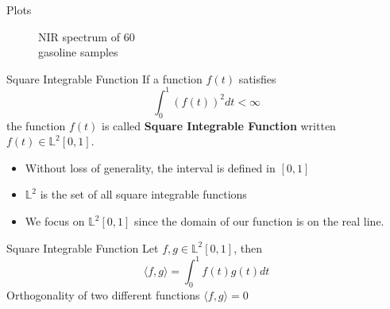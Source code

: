 \documentclass{beamer}
\begin{document}
\begin{frame}{Plots}
\begin{minipage}{.5\textwidth}
\begin{figure}
				\caption{NIR spectrum of 60 \\ gasoline samples}
			\end{figure}
		\end{minipage}
	\end{frame}
	
	\begin{frame}{Square Integrable Function}
		If a function $f(t)$ satisfies
		$$\int_{0}^{1} \left(f(t)\right)^{2}dt < \infty$$
		the function $f(t)$ is called \textbf{Square Integrable Function} written $f(t) \in \mathbb{L}^{2}[0,1]$.
		\begin{itemize}
			\item Without loss of generality, the interval is defined in $[0,1] $
			\item $\mathbb{L}^{2}$ is the set of all square integrable functions
			\item We focus on $\mathbb{L}^{2} [0,1]$ since the domain of our function is on the real line.
		\end{itemize}
	\end{frame}
	
	\begin{frame}{Square Integrable Function}
		Let $f, g \in \mathbb{L}^{2}[0,1]$, then
		$$\langle f,g \rangle = \int_{0}^{1} f(t)g(t)dt$$
		Orthogonality of two different functions $\langle f,g \rangle = 0$
	\end{frame}
	
	
\end{document}
